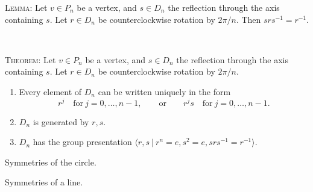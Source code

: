 \documentclass[12pt]{amsart}
\begin{document}
\begin{framed}

\textsc{Lemma:} Let $v\in P_n$ be a vertex, and $s\in D_n$ the reflection through the axis containing $s$. Let $r\in D_n$ be counterclockwise rotation by $2\pi/n$. Then $s r s^{-1} = r^{-1}$.


\

\textsc{Theorem:} Let $v\in P_n$ be a vertex, and $s\in D_n$ the reflection through the axis containing $s$. Let $r\in D_n$ be counterclockwise rotation by $2\pi/n$.
\begin{enumerate}
\item Every element of $D_n$ can be written uniquely in the form 
\[ r^j \quad \text{for} \ j=0,\dots,n-1, \qquad \text{or} \qquad r^j s \quad \text{for} \ j=0,\dots,n-1.\]
\item $D_n$ is generated by $r,s$.
\item $D_n$ has the group presentation $\langle r,s \ | \ r^n=e, s^2=e, srs^{-1} = r^{-1}\rangle$.
\end{enumerate}



\end{framed}



Symmetries of the circle.

Symmetries of a line.
\end{document}
